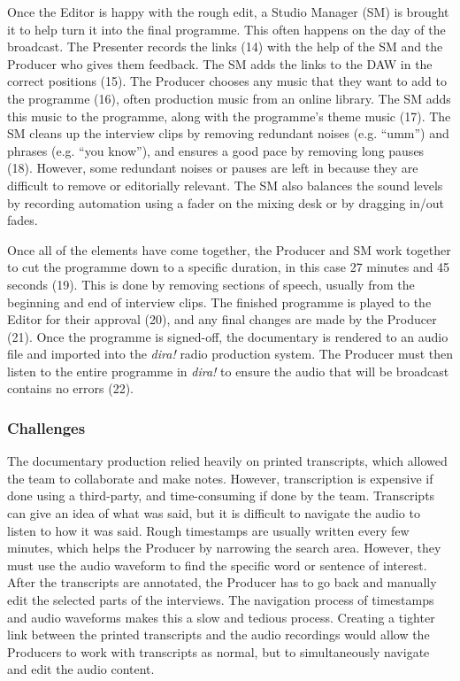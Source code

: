 Once the Editor is happy with the rough edit, a Studio Manager (SM) is brought it to help turn it into the final
programme.  This often happens on the day of the broadcast.  The Presenter records the links (14) with the help of the
SM and the Producer who gives them feedback.  The SM adds the links to the DAW in the correct positions (15). The
Producer chooses any music that they want to add to the programme (16), often production music from an online library.
The SM adds this music to the programme, along with the programme's theme music (17).  The SM cleans up the interview
clips by removing redundant noises (e.g. ``umm'') and phrases (e.g. ``you know''), and ensures a good pace by removing
long pauses (18). However, some redundant noises or pauses are left in because they are difficult to remove or
editorially relevant.  The SM also balances the sound levels by recording automation using a fader on the mixing desk
or by dragging in/out fades. 

Once all of the elements have come together, the Producer and SM work together to cut the programme down to a specific
duration, in this case 27 minutes and 45 seconds (19). This is done by removing sections of speech, usually from the
beginning and end of interview clips.  The finished programme is played to the Editor for their approval (20), and any
final changes are made by the Producer (21).  Once the programme is signed-off, the documentary is rendered to an audio
file and imported into the \textit{dira!} radio production system. The Producer must then listen to the entire
programme in \textit{dira!} to ensure the audio that will be broadcast contains no errors (22).

\subsubsection{Challenges}
The documentary production relied heavily on printed transcripts, which allowed the team to collaborate and make notes.
However, transcription is expensive if done using a third-party, and time-consuming if done by the team.  Transcripts
can give an idea of what was said, but it is difficult to navigate the audio to listen to how it was said. Rough
timestamps are usually written every few minutes, which helps the Producer by narrowing the search area. However, they
must use the audio waveform to find the specific word or sentence of interest. After the transcripts are annotated,
the Producer has to go back and manually edit the selected parts of the interviews. The navigation process of
timestamps and audio waveforms makes this a slow and tedious process.  Creating a tighter link between the printed
transcripts and the audio recordings would allow the Producers to work with transcripts as normal, but to
simultaneously navigate and edit the audio content.

